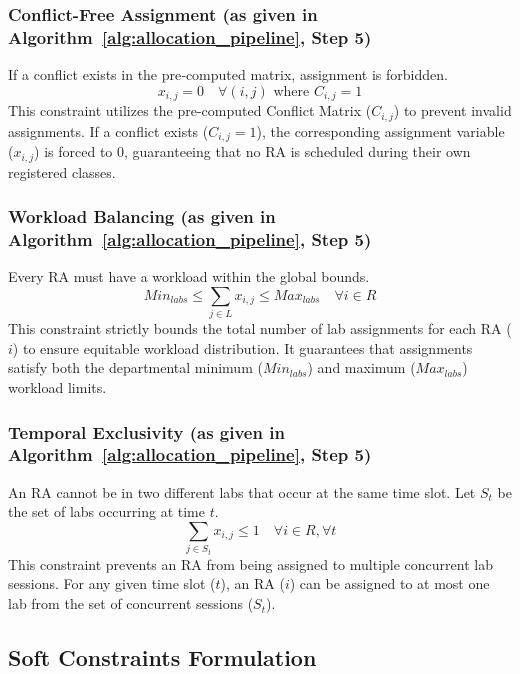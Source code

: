 \documentclass[journal,onecolumn]{IEEEtran}
\begin{document}
\subsubsection{Conflict-Free Assignment (as given in Algorithm~\ref{alg:allocation_pipeline}, Step 5)}
If a conflict exists in the pre‑computed matrix, assignment is forbidden.
\begin{equation}
x_{i,j} = 0 \quad \forall (i,j) \text{ where } C_{i,j} = 1
\label{eq:conflict_free}
\end{equation}
This constraint utilizes the pre-computed Conflict Matrix ($C_{i,j}$) to prevent invalid assignments. If a conflict exists ($C_{i,j} = 1$), the corresponding assignment variable ($x_{i,j}$) is forced to $0$, guaranteeing that no RA is scheduled during their own registered classes.

\subsubsection{Workload Balancing (as given in Algorithm~\ref{alg:allocation_pipeline}, Step 5)}
Every RA must have a workload within the global bounds.
\begin{equation}
Min_{labs} \leq \sum_{j \in L} x_{i,j} \leq Max_{labs} \quad \forall i \in R
\label{eq:workload}
\end{equation}
This constraint strictly bounds the total number of lab assignments for each RA ($i$) to ensure equitable workload distribution. It guarantees that assignments satisfy both the departmental minimum ($Min_{labs}$) and maximum ($Max_{labs}$) workload limits.

\subsubsection{Temporal Exclusivity (as given in Algorithm~\ref{alg:allocation_pipeline}, Step 5)}
An RA cannot be in two different labs that occur at the same time slot. Let $S_t$ be the set of labs occurring at time $t$.
\begin{equation}
\sum_{j \in S_t} x_{i,j} \leq 1 \quad \forall i \in R, \forall t
\label{eq:temporal_excl}
\end{equation}
This constraint prevents an RA from being assigned to multiple concurrent lab sessions. For any given time slot ($t$), an RA ($i$) can be assigned to at most one lab from the set of concurrent sessions ($S_t$).

\subsection{Soft Constraints Formulation}
\end{document}
